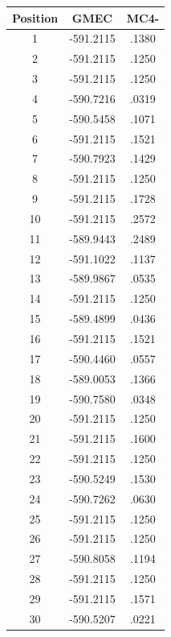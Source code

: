 \documentclass[a4paper,12pt]{article}
\begin{document}
    \begin{table}[!htbp]
      \centering
      
      \begin{tabular}{|c|c|c|}
        



        \hline
        Position & GMEC & MC4- \\
        \hline
        1 & -591.2115 & .1380 \\
        2 & -591.2115 & .1250 \\
        3 & -591.2115 & .1250 \\
        4 & -590.7216 & .0319 \\
        5 & -590.5458 & .1071 \\
        6 & -591.2115 & .1521 \\
        7 & -590.7923 & .1429 \\
        8 & -591.2115 & .1250 \\
        9 & -591.2115 & .1728 \\
        10 & -591.2115 & .2572 \\
        11 & -589.9443 & .2489 \\
        12 & -591.1022 & .1137 \\
        13 & -589.9867 & .0535 \\
        14 & -591.2115 & .1250 \\
        15 & -589.4899 & .0436 \\
        16 & -591.2115 & .1521 \\
        17 & -590.4460 & .0557 \\
        18 & -589.0053 & .1366 \\
        19 & -590.7580 & .0348 \\
        20 & -591.2115 & .1250 \\
        21 & -591.2115 & .1600 \\
        22 & -591.2115 & .1250 \\
        23 & -590.5249 & .1530 \\
        24 & -590.7262 & .0630 \\
        25 & -591.2115 & .1250 \\
        26 & -591.2115 & .1250 \\
        27 & -590.8058 & .1194 \\
        28 & -591.2115 & .1250 \\
        29 & -591.2115 & .1571 \\
        30 & -590.5207 & .0221 \\

\end{tabular}
\end{table}
\end{document}
